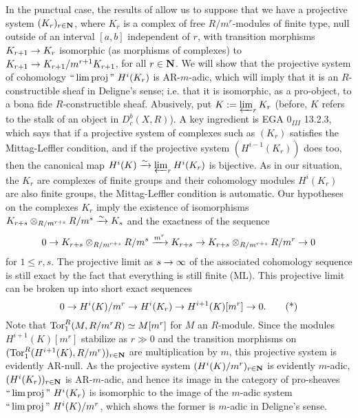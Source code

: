 \documentclass[deligne.tex]{subfiles}
\begin{document}
In the punctual case, the results of
\cite[XV p.\,473]{SGA5} allow us to suppose that we have a projective
system $(K_r)_{r\in\mathbf{N}}$, where $K_r$ is a complex of free $R/m^r$-modules
of finite type, null outside of an interval $[a,b]$ independent of $r$,
with transition morphisms $K_{r+1}\rightarrow K_r$ isomorphic (as morphisms of
complexes) to $K_{r+1}\rightarrow K_{r+1}/m^{r+1}K_{r+1}$, for all $r\in\mathbf{N}$.
We will show that the projective system of cohomology
$``\lim\proj"\ H^i(K_r)$ is AR-$m$-adic, which will imply that it is an
$R$-constructible sheaf in Deligne's sense; i.e. that it is isomorphic, as
a pro-object, to a bona fide $R$-constructible sheaf.
Abusively, put $K:=\varprojlim_r K_r$
(before, $K$ refers to the stalk of an object in $D_c^b(X,R)$).
A key ingredient is EGA $0_{III}$ 13.2.3, which says that if a
projective system of complexes such as $(K_r)$ satisfies the Mittag-Leffler
condition, and if the projective system $(H^{i-1}(K_r))$ does too, then
the canonical map $H^i(K)\xrightarrow\sim\varprojlim_r H^i(K_r)$
is bijective. As in our situation, the $K_r$ are complexes of finite groups 
and their cohomology modules $H^i(K_r)$ are also finite groups, the
Mittag-Leffler condition is automatic.
Our hypotheses on the complexes $K_r$ imply the existence of isomorphisms
$K_{r+s}\otimes_{R/m^{r+s}}R/m^s\xrightarrow\sim K_s$ and the exactness of the
sequence
\begin{equation*}
	0\rightarrow K_{r+s}\otimes_{R/m^{r+s}}R/m^s\xrightarrow{m^r}K_{r+s}\rightarrow
	K_{r+s}\otimes_{R/m^{r+s}}R/m^r\rightarrow0
\end{equation*}
for $1\leq r,s$. The projective limit as $s\rightarrow\infty$ of the associated 
cohomology sequence is still exact by the fact that everything is still 
finite (ML). This projective limit can be broken up into short exact sequences
\begin{equation*}
	0\rightarrow H^i(K)/m^r\rightarrow H^i(K_r)\rightarrow H^{i+1}(K)[m^r]\rightarrow0.\tag{*}
\end{equation*}
Note that $\operatorname{Tor}_1^R(M,R/m^rR)\simeq M[m^r]$ for $M$ an
$R$-module. Since the modules $H^{i+1}(K)[m^r]$ stabilize as $r\gg0$ and
the transition morphisms on $(\operatorname{Tor}_1^R(H^{i+1}(K),R/m^r))_{r\in\mathbf{N}}$ are
multiplication by $m$, this projective
system is evidently AR-null. As the projective system
$(H^i(K)/m^r)_{r\in\mathbf{N}}$ is evidently $m$-adic,
$(H^i(K_r))_{r\in\mathbf{N}}$ is AR-$m$-adic, and hence its image in the
category of pro-sheaves $``\lim\proj"\ H^i(K_r)$ is isomorphic to the
image of the $m$-adic system $``\lim\operatorname{proj}"\ H^i(K)/m^r$, which shows the
former is $m$-adic in Deligne's sense.
\end{document}
